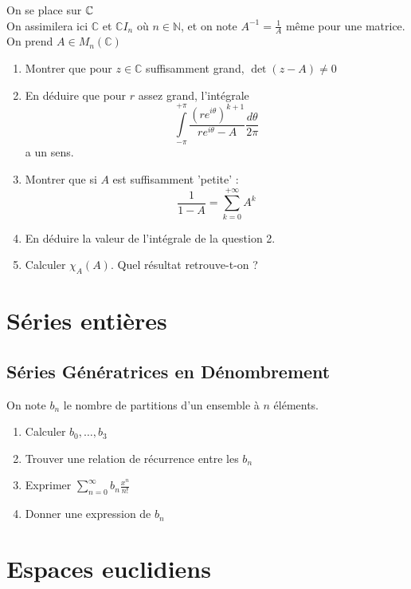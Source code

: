 \documentclass[12pt,a4paper]{exo_book}
\begin{document}
\begin{exo}
    On se place sur $\mathbb{C}$\\
    On assimilera ici $\mathbb{C}$ et $\mathbb{C}I_{n}$ où $n \in \mathbb{N}$, et on note $A^{-1} = \frac{1}{A}$ même pour une matrice.\\
    On prend $A \in M_{n}(\mathbb{C})$
    \begin{enumerate}
        \item Montrer que pour $z \in \mathbb{C}$ suffisamment grand, $\det(z - A) \neq 0 $
        \item En déduire que pour $r$ assez grand, l'intégrale \[\int\limits_{-\pi}^{+\pi}\frac{(re^{i\theta})^{k+1}}{re^{i\theta} - A}\frac{d\theta}{2\pi}\] a un sens. 
        \item Montrer que si $A$ est suffisamment 'petite' : \[\frac{1}{1-A} = \sum_{k=0}^{+\infty} A^{k} \]
        \item En déduire la valeur de l'intégrale de la question 2.
        \item Calculer $\chi_{A}(A)$. Quel résultat retrouve-t-on ?
    \end{enumerate}
\end{exo}


\chapter{Séries entières}

\section{Séries Génératrices en Dénombrement}

\begin{exo}
    On note $b_{n}$ le nombre de partitions d'un ensemble à $n$ éléments.
    \begin{enumerate}
        \item Calculer $b_{0}, \dots, b_{3}$
        \item Trouver une relation de récurrence entre les $b_{n}$
        \item Exprimer $\sum\limits_{n=0}^{\infty}b_{n}\frac{x^{n}}{n!}$
        \item Donner une expression de $b_{n}$
    \end{enumerate}
\end{exo}

\chapter{Espaces euclidiens}
\end{document}
